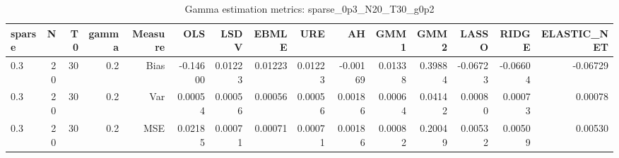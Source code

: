 \begin{table}[!htbp]\centering
\caption{Gamma estimation metrics: sparse_0p3_N20_T30_g0p2}
\label{tab:table1_sparse_0p3_N20_T30_g0p2}
\begin{tabular}{lrrrrrrrrrrrrrr}
\hline
sparse & N & T0 & gamma & Measure & OLS & LSDV & EBMLE & URE & AH & GMM1 & GMM2 & LASSO & RIDGE & ELASTIC_NET \\
\hline
0.3 & 20 & 30 & 0.2 & Bias & -0.14600 & 0.01223 & 0.01223 & 0.01223 & -0.00169 & 0.01338 & 0.39884 & -0.06723 & -0.06604 & -0.06729 \\
0.3 & 20 & 30 & 0.2 & Var & 0.00054 & 0.00056 & 0.00056 & 0.00056 & 0.00186 & 0.00064 & 0.04142 & 0.00080 & 0.00073 & 0.00078 \\
0.3 & 20 & 30 & 0.2 & MSE & 0.02185 & 0.00071 & 0.00071 & 0.00071 & 0.00186 & 0.00082 & 0.20049 & 0.00532 & 0.00509 & 0.00530 \\
\hline
\end{tabular}
\end{table}

